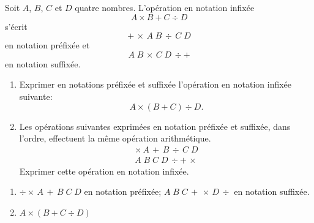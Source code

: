 \begin{exercice}
  Soit $A$, $B$, $C$ et $D$ quatre nombres. L'opération en notation
  infixée
  \begin{equation*}
    A \times B + C \div D
  \end{equation*}
  s'écrit
  \begin{equation*}
    +\, \times\, A\; B\, \div\, C\; D
  \end{equation*}
  en notation préfixée et
  \begin{equation*}
    A\; B\, \times\, C\; D\, \div +
  \end{equation*}
  en notation suffixée.
  \begin{enumerate}
  \item Exprimer en notations préfixée et suffixée l'opération en
    notation infixée suivante:
    \begin{equation*}
      A \times (B + C) \div D.
    \end{equation*}
  \item Les opérations suivantes exprimées en notation préfixée et
    suffixée, dans l'ordre, effectuent la même opération arithmétique.
    \begin{gather*}
      \times\, A\, +\, B\, \div\, C\; D \\
      A\; B\; C\; D\, \div +\, \times
    \end{gather*}
    Exprimer cette opération en notation infixée.
  \end{enumerate}
  \begin{sol}
    \begin{enumerate}
    \item $\div \times\, A\, +\, B\; C\; D$ en notation préfixée;
      $A\; B\; C\, +\, \times\, D\, \div$ en notation suffixée.
    \item $A \times (B + C \div D)$
    \end{enumerate}
  \end{sol}
\end{exercice}

